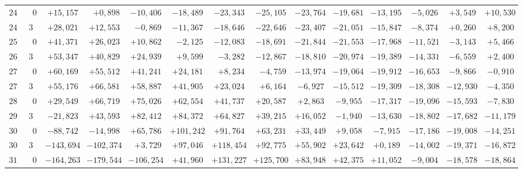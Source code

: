 \begin{landscape}
\begin{longtable}{@{}rr|r|r|r|r|r|r|r|r|r|r|r|r@{}}
\(240\) & \(0\) & \(+15{,}157\) & \(+0{,}898\) & \(-10{,}406\) & \(-18{,}489\) & \(-23{,}343\) & \(-25{,}105\) & \(-23{,}764\) & \(-19{,}681\) & \(-13{,}195\) & \(-5{,}026\) & \(+3{,}549\) & \(+10{,}530\)\\
\(247\) & \(30\) & \(+28{,}021\) & \(+12{,}553\) & \(-0{,}869\) & \(-11{,}367\) & \(-18{,}646\) & \(-22{,}646\) & \(-23{,}407\) & \(-21{,}051\) & \(-15{,}847\) & \(-8{,}374\) & \(+0{,}260\) & \(+8{,}200\)\\
\(255\) & \(0\) & \(+41{,}371\) & \(+26{,}023\) & \(+10{,}862\) & \(-2{,}125\) & \(-12{,}083\) & \(-18{,}691\) & \(-21{,}844\) & \(-21{,}553\) & \(-17{,}968\) & \(-11{,}521\) & \(-3{,}143\) & \(+5{,}466\)\\
\(262\) & \(30\) & \(+53{,}347\) & \(+40{,}829\) & \(+24{,}939\) & \(+9{,}599\) & \(-3{,}282\) & \(-12{,}867\) & \(-18{,}810\) & \(-20{,}974\) & \(-19{,}389\) & \(-14{,}331\) & \(-6{,}559\) & \(+2{,}400\)\\[2pt]
\(270\) & \(0\) & \(+60{,}169\) & \(+55{,}512\) & \(+41{,}241\) & \(+24{,}181\) & \(+8{,}234\) & \(-4{,}759\) & \(-13{,}974\) & \(-19{,}064\) & \(-19{,}912\) & \(-16{,}653\) & \(-9{,}866\) & \(-0{,}910\)\\
\(277\) & \(30\) & \(+55{,}176\) & \(+66{,}581\) & \(+58{,}887\) & \(+41{,}905\) & \(+23{,}024\) & \(+6{,}164\) & \(-6{,}927\) & \(-15{,}512\) & \(-19{,}309\) & \(-18{,}308\) & \(-12{,}930\) & \(-4{,}350\)\\
\(285\) & \(0\) & \(+29{,}549\) & \(+66{,}719\) & \(+75{,}026\) & \(+62{,}554\) & \(+41{,}737\) & \(+20{,}587\) & \(+2{,}863\) & \(-9{,}955\) & \(-17{,}317\) & \(-19{,}096\) & \(-15{,}593\) & \(-7{,}830\)\\
\(292\) & \(30\) & \(-21{,}823\) & \(+43{,}593\) & \(+82{,}412\) & \(+84{,}372\) & \(+64{,}827\) & \(+39{,}215\) & \(+16{,}052\) & \(-1{,}940\) & \(-13{,}630\) & \(-18{,}802\) & \(-17{,}682\) & \(-11{,}179\)\\[2pt]
\(300\) & \(0\) & \(-88{,}742\) & \(-14{,}998\) & \(+65{,}786\) & \(+101{,}242\) & \(+91{,}764\) & \(+63{,}231\) & \(+33{,}449\) & \(+9{,}058\) & \(-7{,}915\) & \(-17{,}186\) & \(-19{,}008\) & \(-14{,}251\)\\
\(307\) & \(30\) & \(-143{,}694\) & \(-102{,}374\) & \(+3{,}729\) & \(+97{,}046\) & \(+118{,}454\) & \(+92{,}775\) & \(+55{,}902\) & \(+23{,}642\) & \(+0{,}189\) & \(-14{,}002\) & \(-19{,}371\) & \(-16{,}872\)\\
\(315\) & \(0\) & \(-164{,}263\) & \(-179{,}544\) & \(-106{,}254\) & \(+41{,}960\) & \(+131{,}227\) & \(+125{,}700\) & \(+83{,}948\) & \(+42{,}375\) & \(+11{,}052\) & \(-9{,}004\) & \(-18{,}578\) & \(-18{,}864\)\\

\end{longtable}
\end{landscape}
